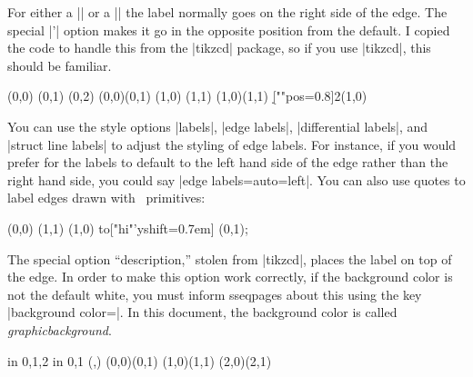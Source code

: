 \documentclass{ltxdoc}
\newenvironment{manualentry}[1]{
    \begin{pgfmanualentry}
    \pgfmanualentryheadline{#1}
    \pgfmanualbody
}{
    \end{pgfmanualentry}
}
\begin{document}
\begin{sseqdata}[name=ex1,degree={#1}{1-#1}]
\begin{manualentry}{\pgfmanualpdflabel{""quotes}{}|"|\meta{text}|"|\opt{\meta{options}}}
For either a |\structline| or a |\class| the label normally goes on the right side of the edge. The special |'| option makes it go in the opposite position from the default. I copied the code to handle this from the |tikzcd| package, so if you use |tikzcd|, this should be familiar.
\begin{codeexample}[]
\begin{sseqpage}
\class(0,0)
\class(0,1)
\class(0,2)
\structline["a"' blue](0,0)(0,1)
\class(1,0)
\class(1,1)
\structline["b"](1,0)(1,1)
\d[""{pos=0.8}]2(1,0)
\end{sseqpage}
\end{codeexample}
You can use the style options |labels|, |edge labels|, |differential labels|, and |struct line labels| to adjust the styling of edge labels. For instance, if you would prefer for the labels to default to the left hand side of the edge rather than the right hand side, you could say |edge labels={auto=left}|.
You can also use quotes to label edges drawn with \tikzname\ primitives:
\begin{codeexample}[]
\begin{sseqpage}
\class(0,0) \class(1,1)
\draw (1,0) to["hi"'{yshift=0.7em}] (0,1);
\end{sseqpage}
\end{codeexample}
The special option ``description,'' stolen from |tikzcd|, places the label on top of the edge. In order to make this option work correctly, if the background color is not the default white, you must inform sseqpages about this using the key |background color=|. In this document, the background color is called \textit{graphicbackground}.
\begin{codeexample}[]
\begin{sseqpage}[no axes,background color=graphicbackground]
\foreach\x in {0,1,2} \foreach\y in {0,1}{
    \class(\x,\y)
}
\structline["a" red](0,0)(0,1)
\structline["a'"'blue,"b"{yshift=1em}](1,0)(1,1)
\structline["c" description](2,0)(2,1)
\end{sseqpage}
\end{codeexample}
\end{manualentry}




\end{sseqdata}
\end{document}
